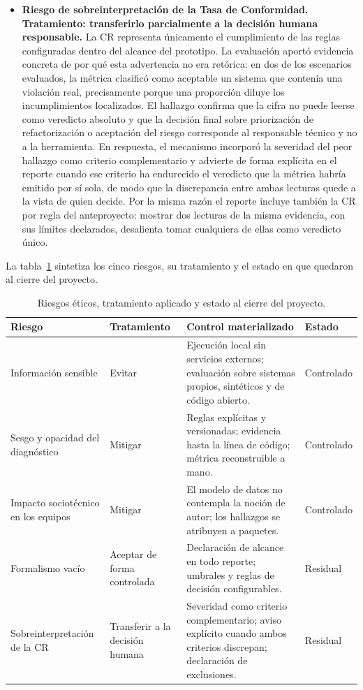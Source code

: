 \begin{itemize}
    \item \textbf{Riesgo de sobreinterpretación de la Tasa de Conformidad. Tratamiento: transferirlo parcialmente a la decisión humana responsable.} La CR representa únicamente el cumplimiento de las reglas configuradas dentro del alcance del prototipo. La evaluación aportó evidencia concreta de por qué esta advertencia no era retórica: en dos de los escenarios evaluados, la métrica clasificó como aceptable un sistema que contenía una violación real, precisamente porque una proporción diluye los incumplimientos localizados. El hallazgo confirma que la cifra no puede leerse como veredicto absoluto y que la decisión final sobre priorización de refactorización o aceptación del riesgo corresponde al responsable técnico y no a la herramienta. En respuesta, el mecanismo incorporó la severidad del peor hallazgo como criterio complementario y advierte de forma explícita en el reporte cuando ese criterio ha endurecido el veredicto que la métrica habría emitido por sí sola, de modo que la discrepancia entre ambas lecturas quede a la vista de quien decide. Por la misma razón el reporte incluye también la CR por regla del anteproyecto: mostrar dos lecturas de la misma evidencia, con sus límites declarados, desalienta tomar cualquiera de ellas como veredicto único.
\end{itemize}

La tabla~\ref{tab:riesgos} sintetiza los cinco riesgos, su tratamiento y el estado en que quedaron al cierre del proyecto.

\begin{table}[H]
\centering
\caption{Riesgos éticos, tratamiento aplicado y estado al cierre del proyecto.}
\label{tab:riesgos}
\footnotesize
\begin{tabularx}{\textwidth}{p{3.1cm}p{2.05cm}Xp{1.9cm}}
\toprule
\textbf{Riesgo} & \textbf{Tratamiento} & \textbf{Control materializado} & \textbf{Estado} \\
\midrule
Información sensible & Evitar & Ejecución local sin servicios externos; evaluación sobre sistemas propios, sintéticos y de código abierto. & Controlado \\
\midrule
Sesgo y opacidad del diagnóstico & Mitigar & Reglas explícitas y versionadas; evidencia hasta la línea de código; métrica reconstruible a mano. & Controlado \\
\midrule
Impacto sociotécnico en los equipos & Mitigar & El modelo de datos no contempla la noción de autor; los hallazgos se atribuyen a paquetes. & Controlado \\
\midrule
Formalismo vacío & Aceptar de forma controlada & Declaración de alcance en todo reporte; umbrales y reglas de decisión configurables. & Residual \\
\midrule
Sobreinterpretación de la CR & Transferir a la decisión humana & Severidad como criterio complementario; aviso explícito cuando ambos criterios discrepan; declaración de exclusiones. & Residual \\
\bottomrule
\end{tabularx}
\end{table}

